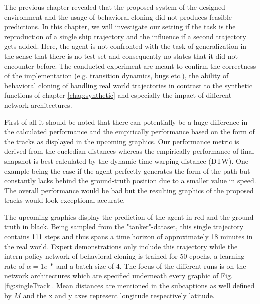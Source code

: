 The previous chapter revealed that the proposed system of the designed environment and the usage of behavioral cloning did not produces feasible predictions. In this chapter, we will investigate our setting if the task is the reproduction of a single ship trajectory and the influence if a second trajectory gets added. Here, the agent is not confronted with the task of generalization in the sense that there is no test set and consequently no states that it did not encounter before. The conducted experiment are meant to confirm the correctness of the implementation (e.g. transition dynamics, bugs etc.), the ability of behavioral cloning of handling real world trajectories in contrast to the synthetic functions of chapter \ref{chap:synthetic} and especially the impact of different network architectures.
\par
First of all it should be noted that there can potentially be a huge difference in the calculated performance and the empirically performance based on the form of the tracks as displayed in the upcoming graphics. Our performance metric is derived from the eucledian distances whereas the empirically performance of final snapshot is best calculated by the dynamic time warping distance (DTW). One example being the case if the agent perfectly generates the form of the path but constantly lacks behind the ground-truth position due to a smaller value in speed. The overall performance would be bad but the resulting graphics of the proposed tracks would look exceptional accurate.
\par
The upcoming graphics display the prediction of the agent in red and the ground-truth in black. Being sampled from the "tanker"-dataset, this single trajectory contains 111 steps and thus spans a time horizon of approximately 18 minutes in the real world. Expert demonstrations only include this trajectory while the intern policy network of behavioral cloning is trained for $50$ epochs, a learning rate of $\alpha = 1e^{-6}$ and a batch size of $4$. The focus of the different runs is on the network architectures which are specified underneath every graphic of Fig. \ref{fig:singleTrack}. Mean distances are mentioned in the subcaptions as well defined by $M$ and the x and y axes represent longitude respectively latitude.
